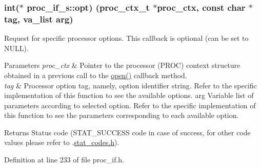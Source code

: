 \subsubsection[{\texorpdfstring{opt}{opt}}]{\setlength{\rightskip}{0pt plus 5cm}int($\ast$ proc\+\_\+if\+\_\+s\+::opt) ({\bf proc\+\_\+ctx\+\_\+t} $\ast$proc\+\_\+ctx, const char $\ast$tag, va\+\_\+list arg)}\hypertarget{structproc__if__s_a4ca0939d6721f368d2560851197fca36}{}\label{structproc__if__s_a4ca0939d6721f368d2560851197fca36}
Request for specific processor options. This callback is optional (can be set to N\+U\+LL). 
\begin{DoxyParams}{Parameters}
{\em proc\+\_\+ctx} & Pointer to the processor (P\+R\+OC) context structure obtained in a previous call to the \textquotesingle{}\hyperlink{structproc__if__s_a34999576771394dfb721463c8455ba06}{open()}\textquotesingle{} callback method. \\
\hline
{\em tag} & Processor option tag, namely, option identifier string. Refer to the specific implementation of this function to see the available options. arg Variable list of parameters according to selected option. Refer to the specific implementation of this function to see the parameters corresponding to each available option. \\
\hline
\end{DoxyParams}
\begin{DoxyReturn}{Returns}
Status code (S\+T\+A\+T\+\_\+\+S\+U\+C\+C\+E\+SS code in case of success, for other code values please refer to .\hyperlink{stat__codes_8h}{stat\+\_\+codes.\+h}). 
\end{DoxyReturn}


Definition at line 233 of file proc\+\_\+if.\+h.


